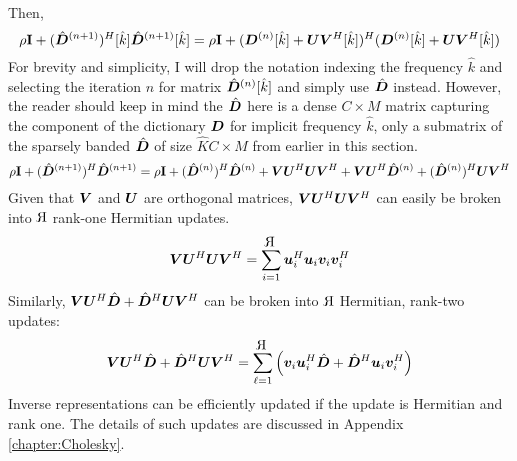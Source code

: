 Then,
%
\begin{equation} \label{equation:Inverse Representation Update}
\rho{\bf I} + (\hat{\bm{D}}^{(n + 1)})^H[\hat{k}]\hat{\bm{D}}^{(n + 1)}[\hat{k}] = \rho{\bf I} + (\bm{D}^{(n)}[\hat{k}] + \bm{U}\bm{V}^H[\hat{k}])^H(\bm{D}^{(n)}[\hat{k}] + \bm{U}\bm{V}^H[\hat{k}])
\end{equation}
%
For brevity and simplicity, I will drop the notation indexing the frequency $\hat{k}$ and selecting the iteration $n$ for matrix $\hat{\bm{D}}^{(n)}[\hat{k}]$ and simply use $\hat{\bm{D}}$ instead. However, the reader should keep in mind the $\hat{\bm{D}}$ here is a dense $C \times M$ matrix capturing the component of the dictionary $\bm{D}$ for implicit frequency $\hat{k}$, only a submatrix of the sparsely banded $\hat{\bm{D}}$ of size $\hat{K}C \times M$ from earlier in this section.
%
\begin{equation}
\rho{\bf I} + (\hat{\bm{D}}^{(n + 1)})^H\hat{\bm{D}}^{(n + 1)} = \rho{\bf I} + (\hat{\bm{D}}^{(n)})^H\hat{\bm{D}}^{(n)} + \bm{V}\bm{U}^H \bm{U}\bm{V}^H + \bm{V}\bm{U}^H\hat{\bm{D}}^{(n)} + (\hat{\bm{D}}^{(n)})^H\bm{U}\bm{V}^H
\end{equation}
%
Given that $\bm{V}$ and $\bm{U}$ are orthogonal matrices, $\bm{V}\bm{U}^H\bm{U}\bm{V}^H$ can easily be broken into $
\reflectbox{R}$ rank-one Hermitian updates.
%
\begin{equation}
\mV\mU^H\mU\mV^H = \sum_{i = 1}^{
\reflectbox{R}} \vu_{i}^H\vu_{i}\vv_{i}\vv_{i}^H
\end{equation}
%
Similarly, $\bm{V}\bm{U}^H\hat{\bm{D}} + \hat{\bm{D}}^H\bm{U}\bm{V}^H$ can be broken into $
\reflectbox{R}$ Hermitian, rank-two updates:
%
\begin{equation}
\mV\mU^H\hat{\mD} + \hat{\mD}^H\mU\mV^H = \sum_{\ell = 1}^{
\reflectbox{R}} \left( \vv_i\vu_i^H\hat{\mD} + \hat{\mD}^H\vu_i\vv_i^H \right)
\end{equation}
%
%
Inverse representations can be efficiently updated if the update is Hermitian and rank one. The details of such updates are discussed in Appendix \ref{chapter:Cholesky}.

